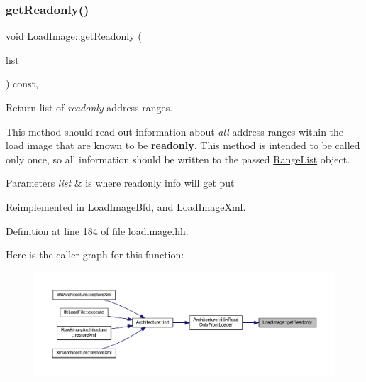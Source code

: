 \subsubsection{\texorpdfstring{getReadonly()}{getReadonly()}}
{\footnotesize\ttfamily void Load\+Image\+::get\+Readonly (\begin{DoxyParamCaption}\item[{\mbox{\hyperlink{class_range_list}{Range\+List}} \&}]{list }\end{DoxyParamCaption}) const\hspace{0.3cm}{\ttfamily [inline]}, {\ttfamily [virtual]}}



Return list of {\itshape readonly} address ranges. 

This method should read out information about {\itshape all} address ranges within the load image that are known to be {\bfseries{readonly}}. This method is intended to be called only once, so all information should be written to the passed \mbox{\hyperlink{class_range_list}{Range\+List}} object. 
\begin{DoxyParams}{Parameters}
{\em list} & is where readonly info will get put \\
\hline
\end{DoxyParams}


Reimplemented in \mbox{\hyperlink{class_load_image_bfd_a8a45d7f2aaa3ae3028f997978f1d9d0c}{Load\+Image\+Bfd}}, and \mbox{\hyperlink{class_load_image_xml_adab4a4d8e035047641c5a1613e9386d6}{Load\+Image\+Xml}}.



Definition at line 184 of file loadimage.\+hh.

Here is the caller graph for this function\+:
\nopagebreak
\begin{figure}[H]
\begin{center}
\leavevmode
\includegraphics[width=350pt]{class_load_image_a31dba7f0f819c97e68f868cc623e4054_icgraph}
\end{center}
\end{figure}
\mbox{\label{class_load_image_ae7aee28b81e5629d90bf104954a6835b}} 
